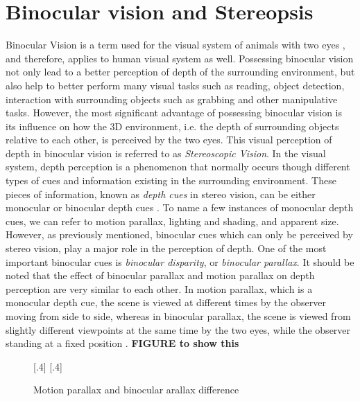 \documentclass[12pt]{report}
\begin{document}
\chapter{Binocular vision and Stereopsis}
Binocular Vision is a term used for the visual system of animals with two eyes \cite{how95}, and therefore, applies to human visual system as well. 
Possessing binocular vision not only lead to a better perception of depth
of the surrounding environment, but also help to better perform many visual tasks such as reading, object detection, interaction with surrounding objects such as grabbing and other manipulative 
tasks. However, the most significant advantage of possessing binocular vision is its influence on how the 3D environment, i.e. the depth of surrounding objects relative to each other, 
is perceived by the two eyes. This visual perception of depth in binocular vision is referred to as {\it Stereoscopic Vision}.
In the visual system, depth perception is a phenomenon that normally occurs though different types of cues and information existing in the surrounding environment. 
These pieces of information, known as {\it depth cues} in stereo vision, can be either monocular or binocular depth cues \cite{how95}.
To name a few instances of monocular depth cues, we can refer to motion parallax, lighting and shading, and apparent size. 
However, as previously mentioned, binocular cues which can only be perceived
by stereo vision, play a major role in the perception of depth. One of the most important binocular cues is {\it binocular disparity}, or {\it binocular parallax}. 
It should be noted that the effect of binocular parallax and motion parallax on depth perception are very similar to each other. 
In motion parallax, which is a monocular depth cue, the scene is viewed at different times by the observer moving from side to side, 
whereas in binocular parallax, the scene is viewed from slightly different viewpoints at
the same time by the two eyes, while the observer standing at a fixed position \cite{how95}. \textbf{FIGURE to show this}

\begin{figure}[!h]
\centering
{}
[.4\linewidth]{}%
[.4\linewidth]{}%
\caption{Motion parallax and binocular arallax difference}
\label{fig:parallax}
\end{figure}

%
%
\end{document}
